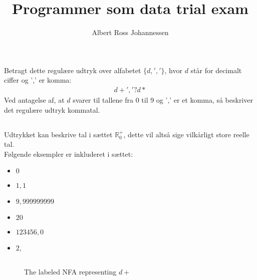 \documentclass[11pt,a4paper]{article}
\begin{document}
\begin{titlepage}
  \title{Programmer som data trial exam}
  \author{Albert Ross Johannessen}
  \maketitle
  \newpage
  \thispagestyle{empty}
  \newpage
\end{titlepage}

\pagestyle{fancy}
\fancyhf{}
\newpage
\section{}
Betragt dette regulære udtryk over alfabetet $\{d, ','\}$, hvor $d$ står for decimalt ciffer og ',' er komma:
\begin{align}
    d+','?d*
\end{align}
Ved antagelse af, at $d$ svarer til tallene fra 0 til 9 og ',' er et komma, så beskriver det regulære udtryk kommatal.
\subsection{}
Udtrykket kan beskrive tal i sættet $\mathbb{R}^+_0$, dette vil altså sige vilkårligt store reelle tal.\\
Følgende eksempler er inkluderet i sættet:
\begin{itemize}
    \item $0$
    \item $1,1$
    \item $9,999999999$
    \item $20$
    \item $123456,0$
    \item $2,$
\end{itemize}
\subsection{}
\begin{figure}[!ht]\label{fig:examfig}
    \centering
    \caption{The labeled NFA representing $d+$}
\end{figure}
\end{document}
